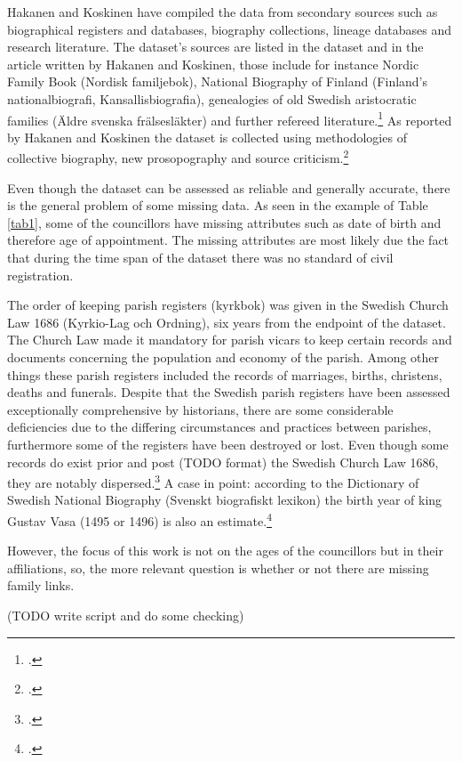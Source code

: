 Hakanen and Koskinen have compiled the data from secondary sources such as biographical registers and databases, biography collections, lineage databases and research literature. The dataset's sources are listed in the dataset and in the article written by Hakanen and Koskinen, those include for instance Nordic Family Book (Nordisk familjebok), National Biography of Finland (Finland's nationalbiografi, Kansallisbiografia), genealogies of old Swedish aristocratic families (Äldre svenska frälsesläkter) and further refereed literature.\footcites[p. 48, 76]{HakanenAKoskinen2017}{councillorsDS} As reported by Hakanen and Koskinen the dataset is collected using methodologies of collective biography, new prosopography and source criticism.\footcite[p. 48.]{HakanenAKoskinen2017}
  
Even though the dataset can be assessed as reliable and generally accurate, there is the general problem of some missing data. As seen in the example of Table \ref{tab1}, some of the councillors have missing attributes such as date of birth and therefore age of appointment. The missing attributes are most likely due the fact that during the time span of the dataset there was no standard of civil registration. 

The order of keeping parish registers (kyrkbok) was given in the Swedish Church Law 1686 (Kyrkio-Lag och Ordning), six years from the endpoint of the dataset. The Church Law made it mandatory for parish vicars to keep certain records and documents concerning the population and economy of the parish. Among other things these parish registers included the records of marriages, births, christens, deaths and funerals. Despite that the Swedish parish registers have been assessed exceptionally comprehensive by historians, there are some considerable deficiencies due to the differing circumstances and practices between parishes, furthermore some of the registers have been destroyed or lost. Even though some records do exist prior and post (TODO format) the Swedish Church Law 1686, they are notably dispersed.\footcite[p. 169-176.]{viikki94} A case in point: according to the Dictionary of Swedish National Biography (Svenskt biografiskt lexikon) the birth year of king Gustav Vasa (1495 or 1496) is also an estimate.\footcite{sbl_gustav_v} 

However, the focus of this work is not on the ages of the councillors but in their affiliations, so, the more relevant question is whether or not there are missing family links. 

(TODO write script and do some checking)


